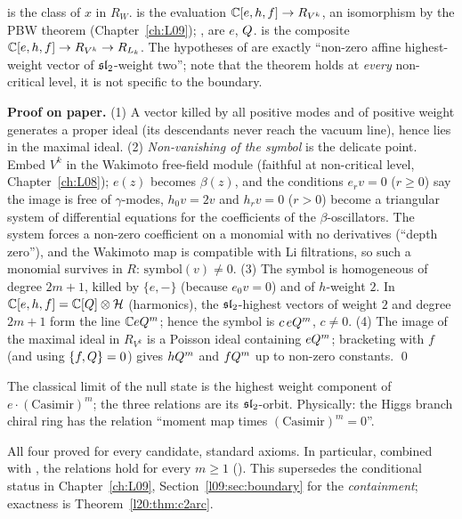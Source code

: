 \begin{dictionary}
 is the class of $x$ in $R_W$.  is the evaluation
${\mathbb{C}}[e,h,f]\to R_{V^k}$, an isomorphism by the PBW theorem (Chapter~\ref{ch:L09}); , 
are $e$, $Q$.  is the composite ${\mathbb{C}}[e,h,f]\to R_{V^k}\to R_{L_k}$. The hypotheses of
 are exactly ``non-zero affine highest-weight vector of $\mathfrak{sl}_2$-weight
two''; note that the theorem holds at \emph{every} non-critical level, it is not specific to the boundary.
\end{dictionary}

\textbf{Proof on paper.} (1) A vector killed by all positive modes and of positive weight generates a proper
ideal (its descendants never reach the vacuum line), hence lies in the maximal ideal. (2) \emph{Non-vanishing of
the symbol} is the delicate point. Embed $V^k$ in the Wakimoto free-field module (faithful at non-critical level,
Chapter~\ref{ch:L08}); $e(z)$ becomes $\beta(z)$, and the conditions $e_rv=0$ ($r\ge0$) say the image is free of
$\gamma$-modes, $h_0v=2v$ and $h_rv=0$ ($r>0$) become a triangular system of differential equations for the
coefficients of the $\beta$-oscillators. The system forces a non-zero coefficient on a monomial with no
derivatives (``depth zero''), and the Wakimoto map is compatible with Li filtrations, so such a monomial
survives in $R$: $\mathrm{symbol}(v)\neq0$. (3) The symbol is homogeneous of degree $2m+1$, killed by
$\{e,-\}$ (because $e_0v=0$) and of $h$-weight $2$. In ${\mathbb{C}}[e,h,f]={\mathbb{C}}[Q]\otimes\mathcal H$ (harmonics), the
$\mathfrak{sl}_2$-highest vectors of weight $2$ and degree $2m+1$ form the line ${\mathbb{C}} eQ^m$; hence the symbol is $c\,eQ^m$,
$c\neq0$. (4) The image of the maximal ideal in $R_{V^k}$ is a Poisson ideal containing $eQ^m$; bracketing
with $f$ (and using $\{f,Q\}=0$) gives $hQ^m$ and $fQ^m$ up to non-zero constants. \qed

\begin{physics}
The classical limit of the null state is the highest weight component of $e\cdot(\text{Casimir})^m$; the
three relations are its $\mathfrak{sl}_2$-orbit. Physically: the Higgs branch chiral ring has the relation
``moment map times $(\text{Casimir})^m=0$''.
\end{physics}

\begin{status}
All four proved for every candidate, standard axioms. In particular, combined with
, the relations hold for every $m\ge1$
(). This supersedes the conditional status in Chapter~\ref{ch:L09},
Section~\ref{l09:sec:boundary} for the \emph{containment}; exactness is Theorem~\ref{l20:thm:c2arc}.
\end{status}

